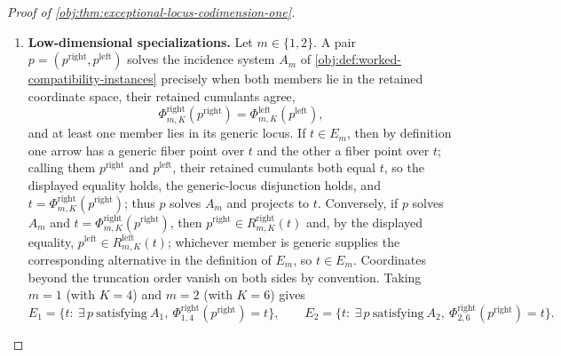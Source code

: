\documentclass[11pt]{article}
\begin{document}
\begin{proof}[Proof of \cref{obj:thm:exceptional-locus-codimension-one}]
\begin{enumerate}
\item \textbf{Low-dimensional specializations.}  Let \(m\in\{1,2\}\).  A pair \(p=(p^{\mathrm{right}},p^{\mathrm{left}})\) solves the incidence system \(A_m\) of \cref{obj:def:worked-compatibility-instances} precisely when both members lie in the retained coordinate space, their retained cumulants agree,
\[
\Phi^{\mathrm{right}}_{m,K}(p^{\mathrm{right}})=\Phi^{\mathrm{left}}_{m,K}(p^{\mathrm{left}}),
\]
and at least one member lies in its generic locus.  If \(t\in E_m\), then by definition one arrow has a generic fiber point over \(t\) and the other a fiber point over \(t\); calling them \(p^{\mathrm{right}}\) and \(p^{\mathrm{left}}\), their retained cumulants both equal \(t\), so the displayed equality holds, the generic-locus disjunction holds, and \(t=\Phi^{\mathrm{right}}_{m,K}(p^{\mathrm{right}})\); thus \(p\) solves \(A_m\) and projects to \(t\).  Conversely, if \(p\) solves \(A_m\) and \(t=\Phi^{\mathrm{right}}_{m,K}(p^{\mathrm{right}})\), then \(p^{\mathrm{right}}\in R^{\mathrm{right}}_{m,K}(t)\) and, by the displayed equality, \(p^{\mathrm{left}}\in R^{\mathrm{left}}_{m,K}(t)\); whichever member is generic supplies the corresponding alternative in the definition of \(E_m\), so \(t\in E_m\).  Coordinates beyond the truncation order vanish on both sides by convention.  Taking \(m=1\) (with \(K=4\)) and \(m=2\) (with \(K=6\)) gives
\[
E_1=\bigl\{t:\ \exists\,p\ \text{satisfying}\ A_1,\ \Phi^{\mathrm{right}}_{1,4}(p^{\mathrm{right}})=t\bigr\},
\qquad
E_2=\bigl\{t:\ \exists\,p\ \text{satisfying}\ A_2,\ \Phi^{\mathrm{right}}_{2,6}(p^{\mathrm{right}})=t\bigr\}.
\]
\end{enumerate}
\end{proof}
\end{document}
